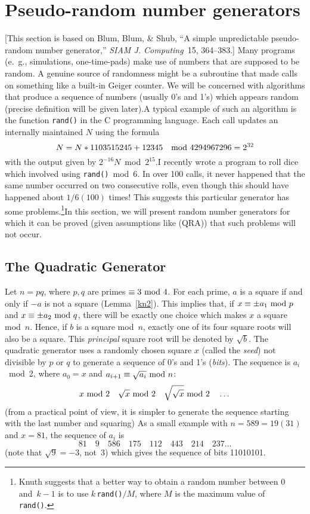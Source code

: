 \section{Pseudo-random number generators}[This section is based on Blum, Blum,
\& Shub, ``A simple unpredictable pseudo-random number generator,''
{\it SIAM J. Computing\/}~15, 364--383.]\pq
Many programs (e.~g., simulations, one-time-pads) make use of numbers
that are supposed to be random.  A genuine source of randomness might
be a subroutine that made calls on something like a built-in Geiger
counter.  We will be concerned with algorithms that produce a sequence
of numbers (usually 0's and 1's) which appears random (precise definition
will be given later).\pq A typical example of such an algorithm is the
function {\tt rand()} in the C programming language. Each call updates
an internally maintained $N$ using the formula
$$N=N*1103515245+12345\quad\hbox{mod } 4294967296=2^{32}$$with the 
output given by $2^{-16}N$~mod~$2^{15}$.\pq I recently wrote a program
to roll dice which involved using {\tt rand()}~mod~6.  In over 100
calls, it never happened that the same number occurred on two consecutive
 rolls, even though this should have happened about $1/6(100)$ times!
This suggests this particular generator has some problems.\footnote{Knuth
suggests that a better way to obtain a random number between 0 and~$k-1$
is to use $k\,${\tt rand()}${}/M$, where $M$ is the maximum value of {\tt
rand()}.}\pq In this section, we will present random number generators
for which it can be proved (given assumptions like (QRA)) that such
problems will not occur.
\subsection{The Quadratic Generator} Let $n=pq$, where $p,q$ are primes
$\equiv3\hbox{ mod }4$.  For each prime, $a$ is a square if and only if $-a$ is not
a square (Lemma~\ref{kn2}).
This implies that, if $x\equiv\pm a_1\hbox{ mod }p$ and $x\equiv\pm a_2\hbox{ mod }q$,
there will be exactly one choice which makes $x$ a square mod~$n$.
Hence, if $b$ is a square mod~$n$, exactly one of its four square roots
will also be a square.  This {\it principal\/} square root will be
denoted by $\sqrt b$.
\pq The quadratic generator uses a randomly chosen square $x$ (called the 
{\it seed\/}) not divisible by $p$ or $q$ to generate a sequence of
0's and 1's ({\it bits\/}).  The sequence is $a_i$~mod~2, where $a_0=x$
and $a_{i+1}\equiv\sqrt{a_i}\hbox{ mod }n$:$$x\ \hbox{mod }2\quad\sqrt x\hbox{ mod }2
\quad\sqrt{\sqrt{x}}\hbox{ mod }2\quad\dots$$
(from a practical point of view, it is simpler to generate the sequence
starting with the last number and squaring)\pq
As a small example with $n=589=19(31)$ and $x=81$, the sequence of $a_i$ is
$$81\quad9\quad586\quad175\quad112\quad443\quad214\quad237\dots$$(note
that $\sqrt 9=-3$, not~3) which gives the sequence of bits 11010101.
